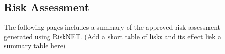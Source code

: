 \documentclass[a4paper,12pt]{report}
\begin{document}
\begin{appendices}
	\chapter{Risk Assessment}
	The following pages includes a summary of the approved risk assessment generated using RiskNET.
	(Add a short table of lisks and its effect liek a summary table here)
	
\end{appendices}
\end{document}
